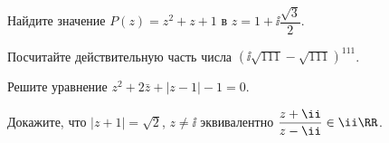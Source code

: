 %
%


\begin{problems}

\item
Найдите значение $P(z) = z^2 + z + 1$ в
$z = 1 + \ii \dfrac{\sqrt{3}}{2}$.

\item
Посчитайте действительную часть числа
$\left(\ii \sqrt{111} - \sqrt{111}\right)^{111}$.

\item
Решите уравнение
$z^2 + 2 \bar z + |z - 1| - 1 = 0$.

\item
Докажите, что
$|z + 1| = \sqrt{2}$, $z \neq \ii$
эквивалентно
$\dfrac{z + \ii}{z - \ii} \in \ii \RR$.

\end{problems}

